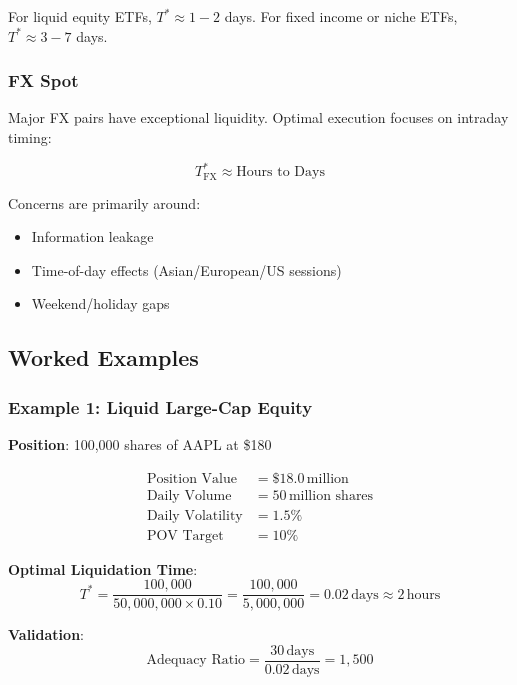\documentclass[11pt,a4paper]{article}
\begin{document}
For liquid equity ETFs, $T^* \approx 1-2$ days. For fixed income or niche ETFs, $T^* \approx 3-7$ days.

\subsubsection{FX Spot}

Major FX pairs have exceptional liquidity. Optimal execution focuses on intraday timing:

\begin{equation}
T^*_{\text{FX}} \approx \text{Hours to Days}
\end{equation}

Concerns are primarily around:
\begin{itemize}
    \item Information leakage
    \item Time-of-day effects (Asian/European/US sessions)
    \item Weekend/holiday gaps
\end{itemize}

\subsection{Worked Examples}

\subsubsection{Example 1: Liquid Large-Cap Equity}

\textbf{Position}: 100,000 shares of AAPL at \$180

\begin{align*}
\text{Position Value} &= \$18.0\,\text{million} \\
\text{Daily Volume} &= 50\,\text{million shares} \\
\text{Daily Volatility} &= 1.5\% \\
\text{POV Target} &= 10\%
\end{align*}

\textbf{Optimal Liquidation Time}:
\begin{equation}
T^* = \frac{100,000}{50,000,000 \times 0.10} = \frac{100,000}{5,000,000} = 0.02\,\text{days} \approx 2\,\text{hours}
\end{equation}

\textbf{Validation}:
\begin{equation}
\text{Adequacy Ratio} = \frac{30\,\text{days}}{0.02\,\text{days}} = 1,500
\end{equation}
\end{document}
